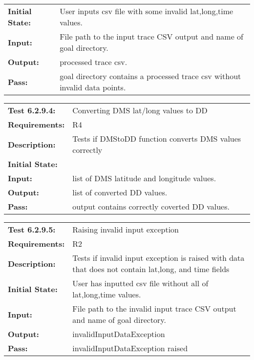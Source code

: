 \documentclass[12pt, titlepage]{article}
\begin{document}
{\begin{tabular}{|l|p{10cm}|}
    \bf{Initial State}: & User inputs csv file with some invalid lat,long,time values. \\
    \bf{Input}: & File path to the input trace CSV output and name of goal directory. \\
    \bf{Output}: & processed trace csv. \\
    \bf{Pass}: & goal directory contains a processed trace csv without invalid data points. \\
    \hline
\end{tabular}
\begin{tabular}{|l|p{10cm}|}
    \hline
    \bf{Test} 6.2.9.4: & Converting DMS lat/long values to DD \\
    \bf{Requirements}: & R4\\
    \bf{Description}: & Tests if DMStoDD function converts DMS values correctly \\
    \bf{Initial State}: &  \\
    \bf{Input}: & list of DMS latitude and longitude values. \\
    \bf{Output}: & list of converted DD values. \\
    \bf{Pass}: & output contains correctly coverted DD values. \\
    \hline
\end{tabular}
\begin{tabular}{|l|p{10cm}|}
    \hline
    \bf{Test} 6.2.9.5: & Raising invalid input exception \\
    \bf{Requirements}: & R2 \\
    \bf{Description}: & Tests if invalid input exception is raised with data that does not contain lat,long, and time fields \\
    \bf{Initial State}: &  User has inputted csv file without all of lat,long,time values.\\
    \bf{Input}: & File path to the invalid input trace CSV output and name of goal directory. \\
    \bf{Output}: & invalidInputDataException \\
    \bf{Pass}: & invalidInputDataException raised \\
    \hline
\end{tabular}
}
\end{document}
